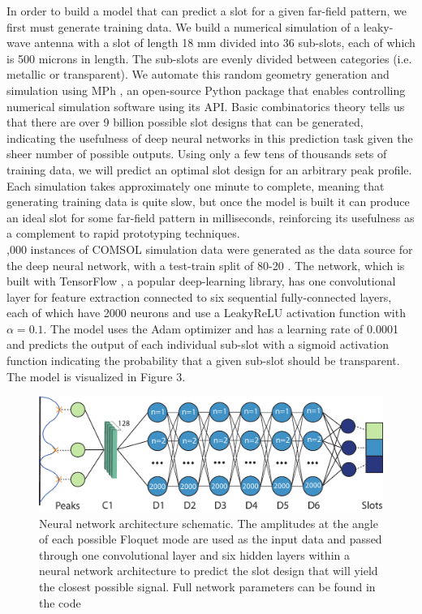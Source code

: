 \documentclass[11pt]{article}
\begin{document}
\noindent In order to build a model that can predict a slot for a given far-field pattern, we first must generate training data. We build a numerical simulation of a leaky-wave antenna with a slot of length 18 mm divided into 36 sub-slots, each of which is 500 microns in length. The sub-slots are evenly divided between categories (i.e. metallic or transparent). We automate this random geometry generation and simulation using MPh \cite{john_hennig_2022_6312347}, an open-source Python package that enables controlling numerical simulation software using its API. Basic combinatorics theory tells us that there are over 9 billion possible slot designs that can be generated, indicating the usefulness of deep neural networks in this prediction task given the sheer number of possible outputs. Using only a few tens of thousands sets of training data, we will  predict an optimal slot design for an arbitrary peak profile. Each simulation takes approximately one minute to complete, meaning that generating training data is quite slow, but once the model is built it can produce an ideal slot for some far-field pattern in milliseconds, reinforcing its usefulness as a complement to rapid prototyping techniques. \\

,000 instances of COMSOL simulation data were generated as the data source for the deep neural network, with a test-train split of 80-20 \cite{molecules26041111}. The network, which is built with TensorFlow \cite{tensorflow2015-whitepaper}, a popular deep-learning library, has one convolutional layer for feature extraction connected to six sequential fully-connected layers, each of which have 2000 neurons and use a LeakyReLU activation function with $\alpha = 0.1$. The model uses the Adam optimizer and has a learning rate of 0.0001 and predicts the output of each individual sub-slot with a sigmoid activation function indicating the probability that a given sub-slot should be transparent. The model is visualized in Figure 3. \\


\begin{figure}[H]
	\centering
	\includegraphics[width=6in]{figures/fig1pdf}
	\caption{Neural network architecture schematic. The amplitudes at the angle of each possible Floquet mode are used as the input data and passed through one convolutional layer and six hidden layers within a neural network architecture to predict the  slot design that will yield the closest possible signal. Full network parameters can be found in the code}
\end{figure}
\end{document}
